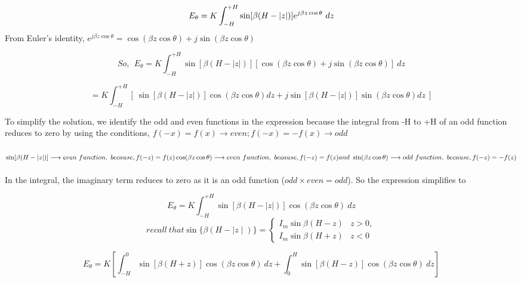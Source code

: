 $$
E_\theta = K\int^{+H}_{-H}
\sin[\beta(H - |z|)]e^{j\beta z\cos\theta}\ dz\\
$$
From Euler's identity, $e^{j\beta z\cos\theta} = \cos(\beta z\cos\theta) + j\sin(\beta z\cos\theta)$

\begin{dmath*}
	So, \ \ E_\theta = K\int^{+H}_{-H}
	\sin[\beta(H - |z|)]\left[\cos(\beta z\cos\theta) + j\sin(\beta z\cos\theta)\right]\ dz
\end{dmath*}

\begin{dmath*}
	= K\int^{+H}_{-H}\left[\
	\sin[\beta(H - |z|)]\cos(\beta z\cos\theta)dz + j\sin[\beta(H - |z|)]\sin(\beta z\cos\theta)dz \ \right]
\end{dmath*}

To simplify the solution, we identify the odd and even functions in the expression because the integral from -H to +H of an odd function reduces to zero by using the conditions, $f(-x) = f(x)\longrightarrow even; f(-x) = -f(x)\longrightarrow odd$ \\\\
$\sin[\beta(H - |z|)] \longrightarrow even\ function,\ because, f(-z) = f(z)\\\\
\cos(\beta z\cos\theta)\longrightarrow even\ function,\ because, f(-z) = f(z)\\\\ and  \ 
 \sin(\beta z\cos\theta)\longrightarrow odd\ function,\ because, f(-z) = -f(z)
$

\paragraph{}
In the integral, the imaginary term reduces to zero as it is an odd function ($odd \times even = odd$). So the expression simplifies to 

$$
E_\theta = K\int^{+H}_{-H}\sin[\beta(H - |z|)]\cos(\beta z\cos\theta)\ dz
$$
$$
recall \ that \sin \{\beta(H - \mid z\mid)\} = \begin{cases} I_m\sin{\beta(H - z)}& \text{$z > 0,$}\\
	I_m\sin{\beta(H + z)}&\text{$z < 0$}	\end{cases}
$$

\begin{dmath*}
	E_\theta = K\left[ \int^0_{-H}\sin[\beta(H + z)]\cos(\beta z\cos\theta)\ dz + 
	\int^H_0\sin[\beta(H - z)]\cos(\beta z\cos\theta)\ dz \right]
\end{dmath*}

